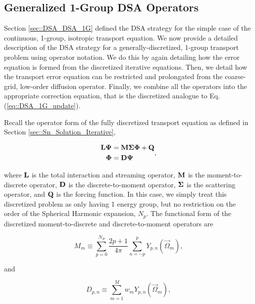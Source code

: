 \subsection{Generalized 1-Group DSA Operators}
\label{sec::DSA_DSA_Operator}

Section \ref{sec::DSA_DSA_1G} defined the DSA strategy for the simple case of the continuous, 1-group, isotropic transport equation. We now provide a detailed description of the DSA strategy for a generally-discretized, 1-group transport problem using operator notation. We do this by again detailing how the error equation is formed from the discretized iterative equations. Then, we detail how the transport error equation can be restricted and prolongated from the coarse-grid, low-order diffusion operator. Finally, we combine all the operators into the appropriate correction equation, that is the discretized analogue to Eq. (\ref{eq::DSA_1G_update}).

Recall the operator form of the fully discretized transport equation as defined in Section \ref{sec::Sn_Solution_Iterative},

\begin{equation}
\label{eq::DSA_1G_trans_eq_ops}
\begin{aligned}
{\bf L} {\bf \Psi} &= {\bf M} {\bf \Sigma} {\bf \Phi}  +    {\bf Q} \\
{\bf \Phi} &=  {\bf D} {\bf \Psi}
\end{aligned},
\end{equation}

\noindent where ${\bf L}$ is the total interaction and streaming operator, ${\bf M}$ is the moment-to-discrete operator, ${\bf D}$ is the discrete-to-moment operator, ${\bf \Sigma}$ is the scattering operator, and ${\bf Q}$ is the forcing function. In this case, we simply treat this discretized problem as only having 1 energy group, but no restriction on the order of the Spherical Harmonic expansion, $N_p$. The functional form of the discretized moment-to-discrete and discrete-to-moment operators are

\begin{equation}
\label{eq::DSA_1G_M}
M_{m} \equiv \sum_{p=0}^{N_P} \frac{2p + 1}{4 \pi}   \sum_{n=-p}^{p}  Y_{p,n} (  \vec{\Omega}_m )   ,
\end{equation}

\noindent and 

\begin{equation}
\label{eq::DSA_1G_D}
D_{p,n} \equiv \sum_{m=1}^M w_m Y_{p,n} (\vec{\Omega}_m) ,
\end{equation}

